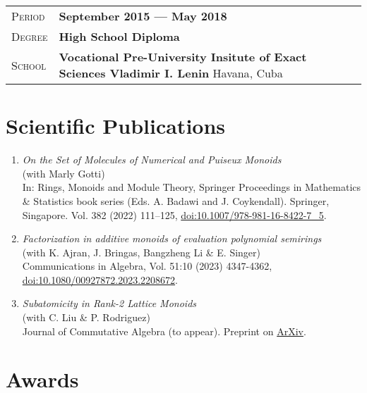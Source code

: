 \documentclass[12pt]{amsart}
\theoremstyle{definition}
\numberwithin{equation}{section}
\newcommand{\gray}{\rowcolor[gray]{.90}} %
\begin{document}
	\vspace{12pt}
	
	\begin{tabularx}{0.97\linewidth}{>{\raggedleft\scshape}p{2cm}X}
	\gray Period & \textbf{September 2015 --- May 2018}\\
	\gray Degree & \textbf{High School Diploma}\\
	\gray School & \textbf{Vocational Pre-University Insitute of Exact Sciences Vladimir I. Lenin} \hfill Havana, Cuba\\
	\end{tabularx}

	\section{Scientific Publications}
	
	\begin{enumerate}
		\item	\textit{On the Set of Molecules of Numerical and Puiseux Monoids} \\(with Marly Gotti)\\ In: Rings, Monoids and Module Theory, Springer Proceedings in Mathematics \& Statistics book series (Eds. A. Badawi and J.
		Coykendall). Springer, Singapore. Vol. 382 (2022) 111–125, \href{https://doi.org/10.1007/978-981-16-8422-7_5}{doi:10.1007/978-981-16-8422-7\_5}.
		
		\item \textit{Factorization in additive monoids of evaluation polynomial semirings} \\ (with K. Ajran, J. Bringas, Bangzheng Li \& E. Singer) \\ Communications in Algebra, Vol. 51:10 (2023) 4347-4362, \href{https://doi.org/10.1080/00927872.2023.2208672}{doi:10.1080/00927872.2023.2208672}. 
		
		\item \textit{Subatomicity in Rank-2 Lattice Monoids} \\(with C. Liu \& P. Rodriguez)\\ Journal of Commutative Algebra (to appear). Preprint on \href{https://arxiv.org/abs/2308.01459}{ArXiv}. 
	\end{enumerate}

\section{Awards}
\end{document}
